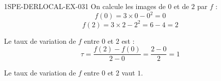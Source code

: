 \begin{corrige}{1SPE-DERLOCAL-EX-031}
On calcule les images de $0$ et de $2$ par $f$ :
\[
f(0) = 3 \times 0 - 0^2 = 0
\]
\[
f(2) = 3 \times 2 - 2^2 = 6 - 4 = 2
\]

Le taux de variation de $f$ entre $0$ et $2$ est :
\[
\tau = \frac{f(2) - f(0)}{2 - 0} = \frac{2 - 0}{2} = 1
\]

Le taux de variation de $f$ entre $0$ et $2$ vaut $\boxed{1}$.
\end{corrige}

